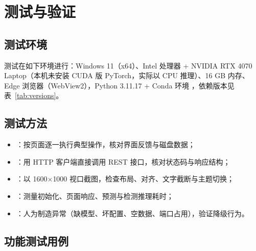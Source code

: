 \section{测试与验证}

\subsection{测试环境}

测试在如下环境进行：Windows 11（x64）、Intel 处理器 + NVIDIA RTX 4070 Laptop（本机未安装 CUDA 版 PyTorch，实际以 CPU 推理）、16 GB 内存、Edge 浏览器（WebView2），Python 3.11.17 + Conda 环境 ，依赖版本见表~\ref{tab:versions}。

\subsection{测试方法}

\begin{itemize}
  \item {}：按页面逐一执行典型操作，核对界面反馈与磁盘数据；
  \item {}：用 HTTP 客户端直接调用 REST 接口，核对状态码与响应结构；
  \item {}：以 1600$\times$1000 视口截图，检查布局、对齐、文字截断与主题切换；
  \item {}：测量初始化、页面响应、预测与检测推理耗时；
  \item {}：人为制造异常（缺模型、坏配置、空数据、端口占用），验证降级行为。
\end{itemize}

\subsection{功能测试用例}

